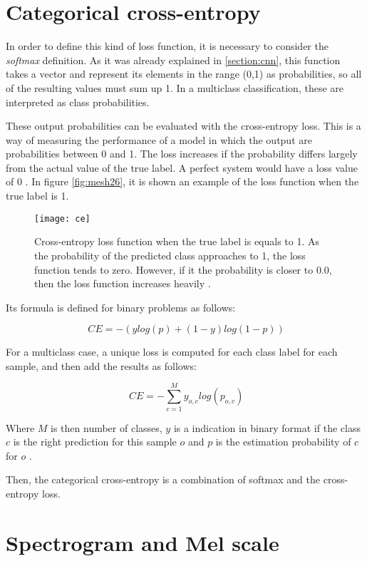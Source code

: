 \section{Categorical cross-entropy}
\label{appendix:categorical-cross-entropy}

	In order to define this kind of loss function, it is necessary to consider the \textit{softmax} definition. As it was already explained in \ref{section:cnn}, this function takes a vector and represent its elements in the range (0,1) as probabilities, so all of the resulting values must sum up 1. In a multiclass classification, these are interpreted as class probabilities.
	
	These output probabilities can be evaluated with the cross-entropy loss. This is a way of measuring the performance of a model in which the output are probabilities between 0 and 1. The loss increases if the probability differs largely from the actual value of the true label. A perfect system would have a loss value of 0 \cite{MLGlossary2017}. In figure \ref{fig:mesh26}, it is shown an example of the loss function when the true label is 1.
	
	\begin{figure}
		\centering
		\captionsetup{justification=centering}
		\texttt{[image: ce]}
		\caption{Cross-entropy loss function when the true label is equals to 1. As the probability of the predicted class approaches to 1, the loss function tends to zero. However, if it the probability is closer to 0.0, then the loss function increases heavily \cite{MLGlossary2017}.}
	\end{figure}

	Its formula is defined for binary problems as follows:
	
	\[
	\ CE = -(ylog(p) + (1 - y)log(1 - p))
	\]

	For a multiclass case, a unique loss is computed for each class label for each sample, and then add the results as follows:
	
	\[
	\ CE = - \sum_{c=1}^{M} y_{o,c}log(p_{o,c})
	\]
	
	Where $M$ is then number of classes, $y$ is a indication in binary format if the class $c$ is the right prediction for this sample $o$ and $p$ is the estimation probability of $c$ for $o$ \cite{MLGlossary2017}. 
	
	Then, the categorical cross-entropy is a combination of softmax and the cross-entropy loss.
	
\section{Spectrogram and Mel scale}
\label{appendix:spectrogram-mel-scale}

